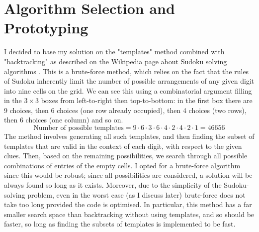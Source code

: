 \documentclass[12pt]{article}
\begin{document}
\section*{Algorithm Selection and Prototyping}
I decided to base my solution on the "templates" method combined with "backtracking" as described on the Wikipedia page about Sudoku solving algorithms \cite{wiki1}.
This is a brute-force method, which relies on the fact that the rules of Sudoku inherently limit the number of possible arrangements of any given digit into nine cells on the grid.
We can see this using a combinatorial argument filling in the $3\times3$ boxes from left-to-right then top-to-bottom: in the first box there are 9 choices, then 6 choices (one row already occupied), then 4 choices (two rows), then 6 choices (one column) and so on.
\[
    \text{Number of possible templates} = 9\cdot6\cdot3\cdot6\cdot4\cdot2\cdot4\cdot2\cdot1 = 46656
\]
The method involves generating all such templates, and then finding the subset of templates that are valid in the context of each digit, with respect to the given clues.
Then, based on the remaining possibilities, we search through all possible combinations of entries of the empty cells.
I opted for a brute-force algorithm since this would be robust; since all possibilities are considered, a solution will be always found so long as it exists.
Moreover, due to the simplicity of the Sudoku-solving problem, even in the worst case (as I discuss later) brute-force does not take too long provided the code is optimised.
In particular, this method has a far smaller search space than backtracking without using templates, and so should be faster, so long as finding the subsets of templates is implemented to be fast.
\end{document}

